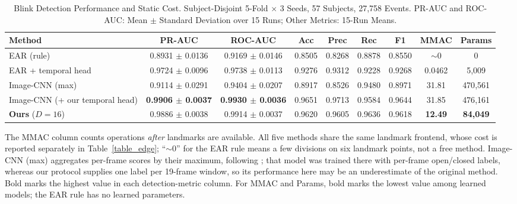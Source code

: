 \documentclass{IEEE_lsens}
\begin{document}
\begin{table}[!t]
\caption{Blink Detection Performance and Static Cost.
Subject-Disjoint 5-Fold $\times$ 3 Seeds, 57 Subjects, 27{,}758 Events.
PR-AUC and ROC-AUC: Mean $\pm$ Standard Deviation over 15 Runs;
Other Metrics: 15-Run Means.}
\label{table_main}
\centering
\renewcommand{\arraystretch}{1.25}
\begin{tabular*}{\textwidth}{l@{\extracolsep{\fill}}cccccccc}
\hline\hline
Method & PR-AUC & ROC-AUC & Acc & Prec & Rec & F1 & MMAC & Params\\
\hline
EAR (rule)              & 0.8931 $\pm$ 0.0136 & 0.9169 $\pm$ 0.0146 & 0.8505 & 0.8268 & 0.8878 & 0.8550 & $\sim$0 & 0\\
EAR + temporal head     & 0.9724 $\pm$ 0.0096 & 0.9738 $\pm$ 0.0113 & 0.9276 & 0.9312 & 0.9228 & 0.9268 & 0.0462 & 5{,}009\\
Image-CNN (max) \cite{daza2020} & 0.9114 $\pm$ 0.0291 & 0.9404 $\pm$ 0.0207 & 0.8917 & 0.8526 & 0.9480 & 0.8971 & 31.81 & 470{,}561\\
Image-CNN (+ our temporal head) & \textbf{0.9906 $\pm$ 0.0037} & \textbf{0.9930 $\pm$ 0.0036} & 0.9651 & 0.9713 & 0.9584 & 0.9644 & 31.85 & 476{,}161\\
\textbf{Ours} ($D=16$)  & 0.9886 $\pm$ 0.0038 & 0.9914 $\pm$ 0.0037 & 0.9620 & 0.9605 & 0.9636 & 0.9618 & \textbf{12.49} & \textbf{84{,}049}\\
\hline\hline
\end{tabular*}
\vspace{0.5mm}
{\footnotesize
The MMAC column counts operations \emph{after} landmarks are available.
All five methods share the same landmark frontend, whose cost is
reported separately in Table~\ref{table_edge}; ``$\sim$0'' for the EAR
rule means a few divisions on six landmark points, not a free method.
Image-CNN (max) aggregates per-frame scores by their maximum, following
\cite{daza2020}; that model was trained there with per-frame
open/closed labels, whereas our protocol supplies one label per
19-frame window, so its performance here may be an underestimate of the
original method. Bold marks the highest value in each detection-metric
column. For MMAC and Params, bold marks the lowest value among learned
models; the EAR rule has no learned parameters.}
\end{table}
\end{document}
